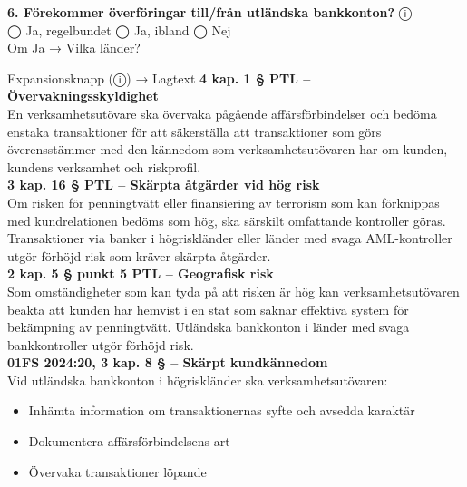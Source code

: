 \documentclass[10pt]{beamer}
\begin{document}
\begin{frame}[label=riskfragor-steg2]
  \textbf{6. Förekommer överföringar till/från utländska bankkonton?} \hspace{0.3cm} ⓘ\\
  ◯ Ja, regelbundet \hspace{0.3cm} ◯ Ja, ibland \hspace{0.3cm} ◯ Nej\\
  Om Ja → Vilka länder? \underline{\hspace{6cm}}
  \begin{alertblock}{Expansionsknapp (ⓘ) → Lagtext}
    \tiny \textbf{4 kap. 1 § PTL – Övervakningsskyldighet}\\
    \tiny En verksamhetsutövare ska övervaka pågående affärsförbindelser och bedöma enstaka transaktioner
    för att säkerställa att transaktioner som görs överensstämmer med den kännedom som verksamhetsutövaren
    har om kunden, kundens verksamhet och riskprofil.\\[0.1cm]
    
    \tiny \textbf{3 kap. 16 § PTL – Skärpta åtgärder vid hög risk}\\
    \tiny Om risken för penningtvätt eller finansiering av terrorism som kan förknippas med kundrelationen
    bedöms som hög, ska särskilt omfattande kontroller göras. Transaktioner via banker i högriskländer
    eller länder med svaga AML-kontroller utgör förhöjd risk som kräver skärpta åtgärder.\\[0.1cm]
    
    \tiny \textbf{2 kap. 5 § punkt 5 PTL – Geografisk risk}\\
    \tiny Som omständigheter som kan tyda på att risken är hög kan verksamhetsutövaren beakta att kunden
    har hemvist i en stat som saknar effektiva system för bekämpning av penningtvätt. Utländska bankkonton
    i länder med svaga bankkontroller utgör förhöjd risk.\\[0.1cm]
    
    \tiny \textbf{01FS 2024:20, 3 kap. 8 § – Skärpt kundkännedom}\\
    \tiny Vid utländska bankkonton i högriskländer ska verksamhetsutövaren:
    \begin{itemize}
      \item Inhämta information om transaktionernas syfte och avsedda karaktär
      \item Dokumentera affärsförbindelsens art
      \item Övervaka transaktioner löpande
    \end{itemize}
    \vspace{0.1cm}
    

\end{alertblock}
\end{frame}
\end{document}
